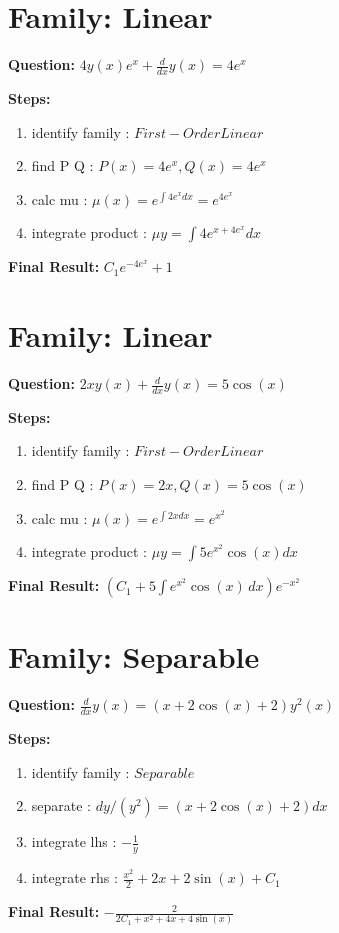 \documentclass{article}
\begin{document}
\section*{Family: Linear}
\textbf{Question:} $4 y{\left(x \right)} e^{x} + \frac{d}{d x} y{\left(x \right)} = 4 e^{x}$

\textbf{Steps:}
\begin{enumerate}
\item identify family :  $First-Order Linear$
\item find P Q :  $P(x)=4 e^{x}, Q(x)=4 e^{x}$
\item calc mu :  $\mu(x) = e^{\int 4 e^{x} dx} = e^{4 e^{x}}$
\item integrate product :  $\mu y = \int 4 e^{x + 4 e^{x}} dx$
\end{enumerate}
\textbf{Final Result:} $C_{1} e^{- 4 e^{x}} + 1$

\section*{Family: Linear}
\textbf{Question:} $2 x y{\left(x \right)} + \frac{d}{d x} y{\left(x \right)} = 5 \cos{\left(x \right)}$

\textbf{Steps:}
\begin{enumerate}
\item identify family :  $First-Order Linear$
\item find P Q :  $P(x)=2 x, Q(x)=5 \cos{\left(x \right)}$
\item calc mu :  $\mu(x) = e^{\int 2 x dx} = e^{x^{2}}$
\item integrate product :  $\mu y = \int 5 e^{x^{2}} \cos{\left(x \right)} dx$
\end{enumerate}
\textbf{Final Result:} $\left(C_{1} + 5 \int e^{x^{2}} \cos{\left(x \right)}\, dx\right) e^{- x^{2}}$

\section*{Family: Separable}
\textbf{Question:} $\frac{d}{d x} y{\left(x \right)} = \left(x + 2 \cos{\left(x \right)} + 2\right) y^{2}{\left(x \right)}$

\textbf{Steps:}
\begin{enumerate}
\item identify family :  $Separable$
\item separate :  $dy / (y^{2}) = (x + 2 \cos{\left(x \right)} + 2) dx$
\item integrate lhs :  $- \frac{1}{y}$
\item integrate rhs :  $\frac{x^{2}}{2} + 2 x + 2 \sin{\left(x \right)} + C_1$
\end{enumerate}
\textbf{Final Result:} $- \frac{2}{2 C_{1} + x^{2} + 4 x + 4 \sin{\left(x \right)}}$
\end{document}
